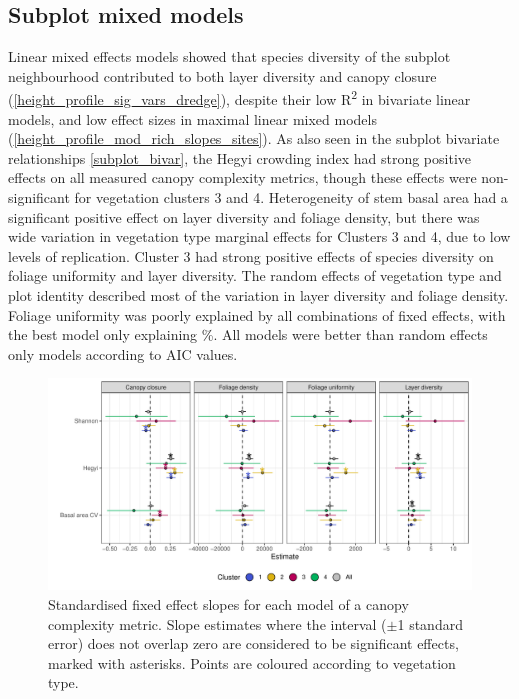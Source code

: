 \documentclass[11pt,a4paper]{article}
\begin{document}
\subsection{Subplot mixed models}

Linear mixed effects models showed that species diversity of the subplot neighbourhood contributed to both layer diversity and canopy closure (\autoref{height_profile_sig_vars_dredge}), despite their low R\textsuperscript{2} in bivariate linear models, and low effect sizes in maximal linear mixed models (\autoref{height_profile_mod_rich_slopes_sites}). As also seen in the subplot bivariate relationships \autoref{subplot_bivar}, the Hegyi crowding index had strong positive effects on all measured canopy complexity metrics, though these effects were non-significant for vegetation clusters 3 and 4. Heterogeneity of stem basal area had a significant positive effect on layer diversity and foliage density, but there was wide variation in vegetation type marginal effects for Clusters 3 and 4, due to low levels of replication. Cluster 3 had strong positive effects of species diversity on foliage uniformity and layer diversity. The random effects of vegetation type and plot identity described most of the variation in layer diversity and foliage density. Foliage uniformity was poorly explained by all combinations of fixed effects, with the best model only explaining \bestUnifRsqS\%. All models were better than random effects only models according to AIC values.

\begin{figure}
	\includegraphics[width=\linewidth]{height_profile_mod_rich_slopes_sites}
	\caption{Standardised fixed effect slopes for each model of a canopy complexity metric. Slope estimates where the interval ($\pm$1 standard error) does not overlap zero are considered to be significant effects, marked with asterisks. Points are coloured according to vegetation type.}
	\label{height_profile_mod_rich_slopes_sites}
\end{figure}
\end{document}
